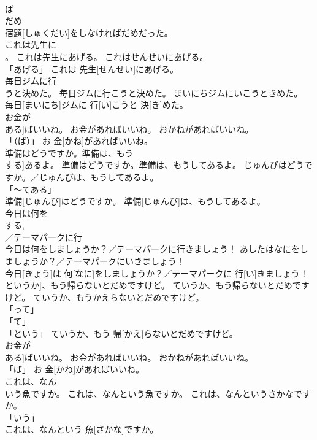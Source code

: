 \documentclass[8pt]{extreport}
\begin{document}
\begin{CJK}{UTF8}{min}
\\	ば
\\	だめ
\\	宿題[しゅくだい]をしなければだめだった。		
\\	これは先生に
\\	。	これは先生にあげる。	これはせんせいにあげる。	
\\	「あげる」	これは 先生[せんせい]にあげる。		
\\	毎日ジムに行
\\	うと決めた。	毎日ジムに行こうと決めた。	まいにちジムにいこうときめた。	
\\	毎日[まいにち]ジムに 行[い]こうと 決[き]めた。		
\\	お金が
\\	ある]ばいいね。	お金があればいいね。	おかねがあればいいね。	
\\	「（ば）」	お 金[かね]があればいいね。		
\\	準備はどうですか。準備は、もう
\\	する]あるよ。	準備はどうですか。準備は、もうしてあるよ。	じゅんびはどうですか。／じゅんびは、もうしてあるよ。	
\\	「～てある」 
\\	準備[じゅんび]はどうですか。 準備[じゅんび]は、もうしてあるよ。		
\\	今日は何を
\\	する, 
\\	／テーマパークに行
\\	今日は何をしましょうか？／テーマパークに行きましょう！	あしたはなにをしましょうか？／テーマパークにいきましょう！	
\\	今日[きょう]は 何[なに]をしましょうか？／テーマパークに 行[い]きましょう！		
\\	というか]、もう帰らないとだめですけど。	ていうか、もう帰らないとだめですけど。	ていうか、もうかえらないとだめですけど。	
\\	「って」 
\\	「て」 
\\	「という」	ていうか、もう 帰[かえ]らないとだめですけど。		
\\	お金が
\\	ある]ばいいね。	お金があればいいね。	おかねがあればいいね。	
\\	「ば」	お 金[かね]があればいいね。		
\\	これは、なん
\\	いう魚ですか。	これは、なんという魚ですか。	これは、なんというさかなですか。	
\\	「いう」 
\\	これは、なんという 魚[さかな]ですか。		

\end{CJK}
\end{document}
